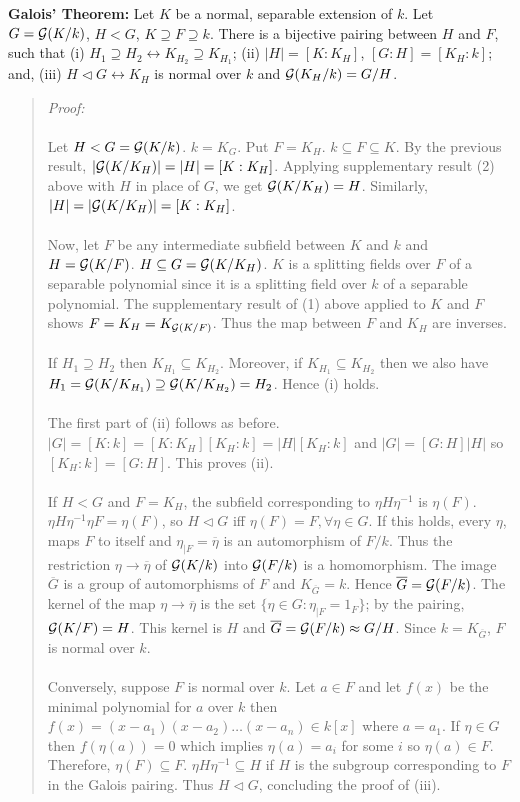 {\bf Galois' Theorem:} Let $K$ be a normal, separable extension of $k$.  Let $G={\cal G}(K/k)$,
$H<G$, $K \supseteq F \supseteq k$.  There is a bijective pairing between $H$ and $F$, such
that
(i) $H_{1} \supseteq H_{2} \leftrightarrow K_{H_{2}} \supseteq K_{H_{1}}$;
(ii) $|H|= [K:K_H]$, $[G:H]= [K_H:k]$; and,
(iii) $H \lhd G \leftrightarrow K_H$ is normal over $k$
and ${\cal G}(K_H/k)=G/H$.
\begin{quote}
\emph{Proof:} 
\\
\\
Let  $H<G={\cal G}(K/k)$.  $k=K_G$.
Put $F = K_H$.  $k \subseteq F \subseteq K$.  By the previous result,
$|{\cal G}(K/K_H)|=|H| = [K:K_H]$.  
Applying supplementary result (2) above with $H$ in place of $G$, we get
${\cal G}(K/K_H)= H$.
Similarly,  $|H|=|{\cal G}(K/K_H)|=[K:K_H]$.
\\
\\
Now, let $F$ be any intermediate subfield between $K$ and $k$ and $H= {\cal G}(K/F)$.
$H \subseteq G={\cal G}(K/K_H)$.
$K$ is a splitting fields over $F$ of
a separable polynomial since it is a splitting field over $k$ of a separable polynomial.
The supplementary result of (1) above applied to $K$ and $F$ shows
$F=K_H= K_{{\cal G}(K/F)}$.
Thus the map between $F$ and $K_H$ are inverses.
\\
\\
If $H_1 \supseteq H_2$ then 
$K_{H_1} \subseteq K_{H_2}$.
Moreover, if $K_{H_1} \subseteq K_{H_2}$ then we also have
$H_1 = {\cal G}(K/K_{H_1}) \supseteq {\cal G}(K/K_{H_2}) = H_2$. Hence (i)
holds. 
\\
\\
The first part of (ii) follows as before.
$|G|= [K:k] = [K:K_H][K_H:k]= |H| [K_H:k]$ and $|G|= [G:H] |H|$ so
$[K_H:k]= [G:H]$.  This proves (ii).
\\
\\
If $H < G$ and $F= K_H$, the subfield corresponding 
to $\eta H \eta^{-1}$ is $\eta(F)$.
$\eta H \eta^{-1} \eta F= \eta(F)$,
so $H \lhd G$ iff $\eta(F)=F, \forall \eta \in G$.  If this holds, every
$\eta$, maps
$F$ to itself and $\eta_{|F}= {\overline {\eta}}$ is an automorphism of $F/k$.
Thus the restriction $\eta \rightarrow {\overline {\eta}}$ of
${\cal G}(K/k)$ into ${\cal G}(F/k)$ is a homomorphism.  
The image ${\overline G}$ is a group of automorphisms
of $F$ and $K_{{\overline G}}=k$.
Hence ${\overline G}= {\cal G}(F/k)$.
The kernel of the map 
$\eta \rightarrow {\overline {\eta}}$ is the set $\{ \eta \in G: \eta_{|F}=1_{F} \}$;
by the pairing, ${\cal G}(K/F)= H$.  This kernel is $H$ and
${\overline G}= {\cal G}(F/k) \approx G/H$.  Since $k= K_{\overline G}$,
$F$ is normal over $k$.
\\
\\
Conversely, suppose $F$ is normal over $k$.  Let $a \in F$ and let $f(x)$ be the
minimal polynomial for $a$ over $k$ then $f(x)= (x-a_1) (x-a_2) \ldots (x-a_n) \in k[x]$
where $a=a_1$.  If $\eta \in G$ then $f(\eta(a))=0$ which implies $\eta(a)= a_i$
for some $i$ so $\eta(a) \in F$.  
Therefore, $\eta(F) \subseteq F$.  $\eta H \eta^{-1} \subseteq H$ if $H$ is the subgroup
corresponding to $F$ in the Galois pairing. Thus $H \lhd G$, concluding the proof
of (iii).
\end{quote}
